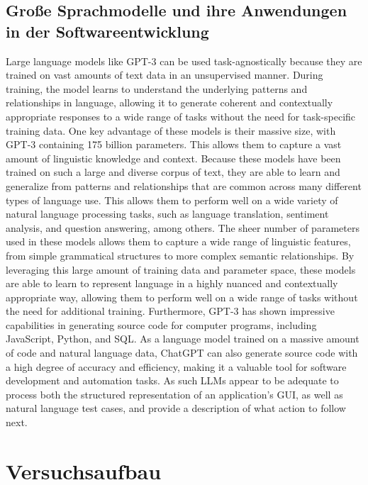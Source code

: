\section{Große Sprachmodelle und ihre Anwendungen in der Softwareentwicklung}
\label{subsec:Foundations:LLM}

Large language models like GPT-3 can be used task-agnostically because they are trained on vast amounts of text data in an unsupervised manner. During training, the model learns to understand the underlying patterns and relationships in language, allowing it to generate coherent and contextually appropriate responses to a wide range of tasks without the need for task-specific training data.
One key advantage of these models is their massive size, with GPT-3 containing 175 billion parameters.
This allows them to capture a vast amount of linguistic knowledge and context.
Because these models have been trained on such a large and diverse corpus of text, they are able to learn and generalize from patterns and relationships that are common across many different types of language use. This allows them to perform well on a wide variety of natural language processing tasks, such as language translation, sentiment analysis, and question answering, among others.
The sheer number of parameters used in these models allows them to capture a wide range of linguistic features, from simple grammatical structures to more complex semantic relationships. By leveraging this large amount of training data and parameter space, these models are able to learn to represent language in a highly nuanced and contextually appropriate way, allowing them to perform well on a wide range of tasks without the need for additional training.
Furthermore, GPT-3 has shown impressive capabilities in generating source code for computer programs, including JavaScript, Python, and SQL. As a language model trained on a massive amount of code and natural language data, ChatGPT can also generate source code with a high degree of accuracy and efficiency, making it a valuable tool for software development and automation tasks.
As such LLMs appear to be adequate to process both the structured representation of an application’s GUI, as well as natural language test cases, and provide a description of what action to follow next.


\chapter{Versuchsaufbau}
\label{ch:ExperimentalSetup}

